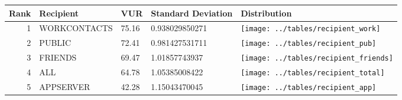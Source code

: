 \begin{table}[t]
\begin{center}
\small
\begin{tabular}{| r | p{1.5cm} | p{1cm} | p{1cm} | p{2cm} |}
\hline
Rank & Recipient & VUR & Standard Deviation & Distribution\\
\hline
1& WORKCONTACTS & 75.16 & 0.938029850271& \texttt{[image: ../tables/recipient\_work]}\\ 
2& PUBLIC & 72.41 & 0.981427531711& \texttt{[image: ../tables/recipient\_pub]}\\ 
3& FRIENDS & 69.47 & 1.01857743937 & \texttt{[image: ../tables/recipient\_friends]}\\ 
4& ALL & 64.78 & 1.05385008422& \texttt{[image: ../tables/recipient\_total]}\\ 
5& APPSERVER & 42.28 & 1.15043470045& \texttt{[image: ../tables/recipient\_app]}\\ 
\hline
\end{tabular}
\end{center}
\end{table}